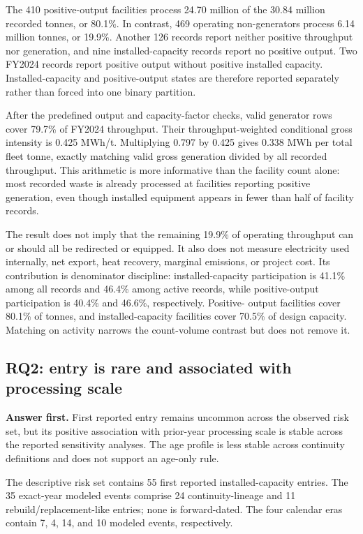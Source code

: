 \documentclass[12pt,letterpaper]{article}
\begin{document}
The 410 positive-output facilities process 24.70 million of the 30.84 million
recorded tonnes, or 80.1\%. In contrast, 469 operating non-generators process
6.14 million tonnes, or 19.9\%. Another 126 records report neither positive
throughput nor generation, and nine installed-capacity records report no
positive output. Two FY2024 records report positive output without positive
installed capacity. Installed-capacity and positive-output states are therefore
reported separately rather than forced into one binary partition.

After the predefined output and capacity-factor checks, valid generator rows
cover 79.7\% of FY2024 throughput. Their throughput-weighted conditional gross
intensity is 0.425 MWh/t. Multiplying 0.797 by 0.425 gives 0.338 MWh per total
fleet tonne, exactly matching valid gross generation divided by all recorded
throughput. This arithmetic is more informative than the facility count alone:
most recorded waste is already processed at facilities reporting positive
generation, even though installed equipment appears in fewer than half of
facility records.

The result does not imply that the remaining 19.9\% of operating throughput can
or should all be redirected or equipped. It also does not measure electricity
used internally, net export, heat recovery, marginal emissions, or project
cost. Its contribution is denominator discipline: installed-capacity
participation is 41.1\% among all records and 46.4\% among active records, while
positive-output participation is 40.4\% and 46.6\%, respectively. Positive-
output facilities cover 80.1\% of tonnes, and installed-capacity facilities
cover 70.5\% of design capacity. Matching on activity narrows the count-volume
contrast but does not remove it.

\subsection{RQ2: entry is rare and associated with processing scale}

\noindent\textbf{Answer first.} First reported entry remains uncommon across
the observed risk set, but its positive association with prior-year processing
scale is stable across the reported sensitivity analyses. The age profile is
less stable across continuity definitions and does not support an age-only
rule.

The descriptive risk set contains 55 first reported installed-capacity entries.
The 35 exact-year modeled events comprise 24 continuity-lineage and 11
rebuild/replacement-like entries; none is forward-dated. The four calendar eras
contain 7, 4, 14, and 10 modeled events, respectively.
\end{document}
